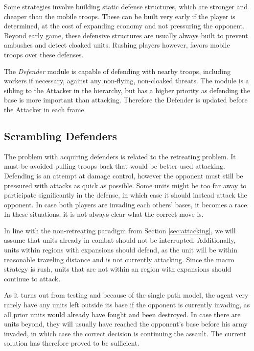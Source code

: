 Some strategies involve building static defense structures, which are stronger and cheaper than the mobile troops. These can be built very early if the player is determined, at the cost of expanding economy and not pressuring the opponent. Beyond early game, these defensive structures are usually always built to prevent ambushes and detect cloaked units. Rushing players however, favors mobile troops over these defenses.

The \emph{Defender} module is capable of defending with nearby troops, including workers if necessary, against any non-flying, non-cloaked threats. The module is a sibling to the Attacker in the hierarchy, but has a higher priority as defending the base is more important than attacking. Therefore the Defender is updated before the Attacker in each frame.

	\subsection*{Scrambling Defenders}
	The problem with acquiring defenders is related to the retreating problem. It must be avoided pulling troops back that would be better used attacking. Defending is an attempt at damage control, however the opponent must still be pressured with attacks as quick as possible. Some units might be too far away to participate significantly in the defense, in which case it should instead attack the opponent. In case both players are invading each others' bases, it becomes a race. In these situations, it is not always clear what the correct move is.
	
	In line with the non-retreating paradigm from Section \ref{sec:attacking}, we will assume that units already in combat should not be interrupted. Additionally, units within regions with expansions should defend, as the unit will be within reasonable traveling distance and is not currently attacking. Since the macro strategy is rush, units that are not within an region with expansions should continue to attack.
	
	As it turns out from testing and because of the single path model, the agent very rarely have any units left outside its base if the opponent is currently invading, as all prior units would already have fought and been destroyed. In case there are units beyond, they will usually have reached the opponent's base before his army invaded, in which case the correct decision is continuing the assault. The current solution has therefore proved to be sufficient.
	
